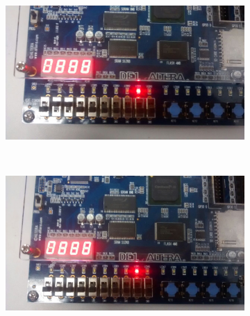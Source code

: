 \begin{figure}
    \centering

    \begin{subfigure}[b]{0.44\textwidth}
        \includegraphics[width=\textwidth]{img/cenario2/circ1}
        \label{fig:circ1}
    \end{subfigure}
    ~
    \begin{subfigure}[b]{0.44\textwidth}
        \includegraphics[width=\textwidth]{img/cenario2/circ2}
        \label{fig:circ2}
    \end{subfigure}



\end{figure}
